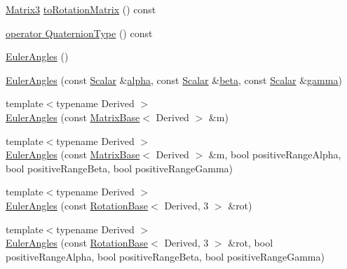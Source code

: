 \begin{DoxyCompactItemize}
\item 
\hyperlink{class_eigen_1_1_euler_angles_ad0f0ee8240849b0f7d028695849cdbad}{Matrix3} \hyperlink{class_eigen_1_1_euler_angles_a11ec16b3ed918fac62d295012ec4e2ac}{to\+Rotation\+Matrix} () const
\item 
\hyperlink{class_eigen_1_1_euler_angles_aa4ccd4b412c3146a9dd58a884eaea42e}{operator Quaternion\+Type} () const
\item 
\hyperlink{class_eigen_1_1_euler_angles_a47be9344fbd4a5b34df45486cfaf1e2b}{Euler\+Angles} ()
\item 
\hyperlink{class_eigen_1_1_euler_angles_a765135b6e5d35248517b4268046840b6}{Euler\+Angles} (const \hyperlink{class_eigen_1_1_euler_angles_a2ab1d433ac9683268446f8905ac31aac}{Scalar} \&\hyperlink{class_eigen_1_1_euler_angles_a6146f78ee0fb9d9a7d685a4654066825}{alpha}, const \hyperlink{class_eigen_1_1_euler_angles_a2ab1d433ac9683268446f8905ac31aac}{Scalar} \&\hyperlink{class_eigen_1_1_euler_angles_a1bf59f8acaed985964c98c1f59d8f5ab}{beta}, const \hyperlink{class_eigen_1_1_euler_angles_a2ab1d433ac9683268446f8905ac31aac}{Scalar} \&\hyperlink{class_eigen_1_1_euler_angles_aa75a5f16105d96eedf81bf9f8e789e21}{gamma})
\item 
{\footnotesize template$<$typename Derived $>$ }\\\hyperlink{class_eigen_1_1_euler_angles_ae2f34ff915892795d3d304c5dd0eec42}{Euler\+Angles} (const \hyperlink{group___core___module_class_eigen_1_1_matrix_base}{Matrix\+Base}$<$ Derived $>$ \&m)
\item 
{\footnotesize template$<$typename Derived $>$ }\\\hyperlink{class_eigen_1_1_euler_angles_ab545bb022c56b1b93463c308f1bcc489}{Euler\+Angles} (const \hyperlink{group___core___module_class_eigen_1_1_matrix_base}{Matrix\+Base}$<$ Derived $>$ \&m, bool positive\+Range\+Alpha, bool positive\+Range\+Beta, bool positive\+Range\+Gamma)
\item 
{\footnotesize template$<$typename Derived $>$ }\\\hyperlink{class_eigen_1_1_euler_angles_a22539c574d7b6ca4577691f533f60061}{Euler\+Angles} (const \hyperlink{class_eigen_1_1_rotation_base}{Rotation\+Base}$<$ Derived, 3 $>$ \&rot)
\item 
{\footnotesize template$<$typename Derived $>$ }\\\hyperlink{class_eigen_1_1_euler_angles_aeaf9524ff49ee720786e78f44c23cc17}{Euler\+Angles} (const \hyperlink{class_eigen_1_1_rotation_base}{Rotation\+Base}$<$ Derived, 3 $>$ \&rot, bool positive\+Range\+Alpha, bool positive\+Range\+Beta, bool positive\+Range\+Gamma)

\end{DoxyCompactItemize}
